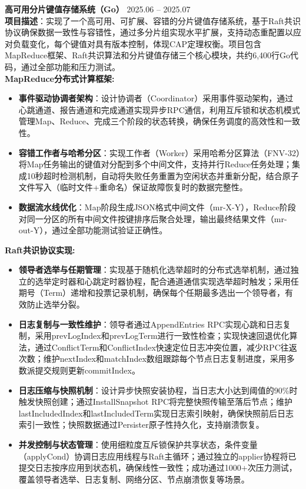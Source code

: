 \noindent
\textbf{高可用分片键值存储系统（Go）} \hfill 2025.06 – 2025.07 \\
\textbf{项目描述}：实现了一个高可用、可扩展、容错的分片键值存储系统，基于Raft共识协议确保数据一致性与容错性，通过多分片组实现水平扩展，支持动态重配置以应对负载变化，每个键值对具有版本控制，体现CAP定理权衡。项目包含MapReduce框架、Raft共识算法和分片键值存储三个核心模块，共约6,400行Go代码，通过全部功能和压力测试。\\

\textbf{MapReduce分布式计算框架:} 
    \begin{itemize}
        \item \textbf{事件驱动协调者架构}：设计协调者（Coordinator）采用事件驱动架构，通过心跳通道、报告通道和完成通道实现异步RPC通信，利用互斥锁和状态机模式管理Map、Reduce、完成三个阶段的状态转换，确保任务调度的高效性和一致性。
        \item \textbf{容错工作者与哈希分区}：实现工作者（Worker）采用哈希分区算法（FNV-32）将Map任务输出的键值对分配到多个中间文件，支持并行Reduce任务处理；集成10秒超时检测机制，自动将失败任务重置为空闲状态并重新分配，结合原子文件写入（临时文件+重命名）保证故障恢复时的数据完整性。
        \item \textbf{数据流水线优化}：Map阶段生成JSON格式中间文件（mr-X-Y），Reduce阶段对同一分区的所有中间文件按键排序后聚合处理，输出最终结果文件（mr-out-Y），通过全部功能测试验证正确性。
    \end{itemize}

\textbf{Raft共识协议实现:}
    \begin{itemize}
        \item \textbf{领导者选举与任期管理}：实现基于随机化选举超时的分布式选举机制，通过独立的选举定时器和心跳定时器协程，配合通道通信实现选举超时触发；采用任期号（Term）递增和投票记录机制，确保每个任期最多选出一个领导者，有效防止选举分裂。
        \item \textbf{日志复制与一致性维护}：领导者通过AppendEntries RPC实现心跳和日志复制，采用prevLogIndex和prevLogTerm进行一致性检查；实现快速回退优化算法，通过ConflictTerm和ConflictIndex快速定位日志冲突位置，减少RPC往返次数；维护nextIndex和matchIndex数组跟踪每个节点日志复制进度，采用多数派提交规则更新commitIndex。
        \item \textbf{日志压缩与快照机制}：设计异步快照安装协程，当日志大小达到阈值的90\%时触发快照创建；通过InstallSnapshot RPC将完整快照传输至落后节点；维护lastIncludedIndex和lastIncludedTerm实现日志索引映射，确保快照前后日志索引一致性；快照数据通过Persister原子性持久化，支持崩溃恢复。
        \item \textbf{并发控制与状态管理}：使用细粒度互斥锁保护共享状态，条件变量（applyCond）协调日志应用线程与Raft主循环；通过独立的applier协程将已提交日志按序应用到状态机，确保线性一致性；成功通过1000+次压力测试，覆盖领导者选举、日志复制、网络分区、节点崩溃恢复等场景。
    \end{itemize}

